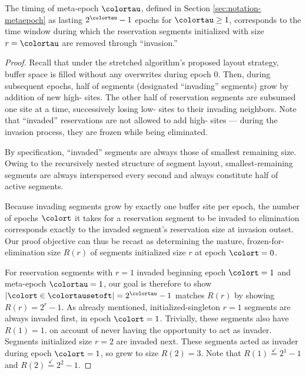\begin{lemma}
\label{thm:stretched-meta-epoch}

The timing of meta-epoch $\colortau$, defined in Section \ref{sec:notation-metaepoch} as lasting $2^{\colortau} - 1$ epochs for $\colortau\geq1$, corresponds to the time window during which the reservation segments initialized with size $r=\colortau$ are removed through ``invasion.''
\end{lemma}

\begin{proof}

Recall that under the stretched algorithm's proposed layout strategy, buffer space is filled without any overwrites during epoch 0.
Then, during subsequent epochs, half of segments (designated ``invading'' segments) grow by addition of new high-\hv{} sites.
The other half of reservation segments are subsumed one site at a time, successively losing low-\hv{} sites to their invading neighbors.
Note that ``invaded'' reservations are not allowed to add high-\hv{} sites --- during the invasion process, they are frozen while being eliminated.

By specification, ``invaded'' segments are always those of smallest remaining size.
Owing to the recursively nested structure of segment layout, smallest-remaining segments are always interspersed every second and always constitute half of active segments.

Because invading segments grow by exactly one buffer site per epoch, the number of epochs $\colort$ it takes for a reservation segment to be invaded to elimination corresponds exactly to the invaded segment's reservation size at invasion outset.
Our proof objective can thus be recast as determining the mature, frozen-for-elimination size $R(r)$ of segments initialized size $r$ at epoch $\colort=0$.

For reservation segments with $r=1$ invaded beginning epoch $\colort=1$ and meta-epoch $\colortau = 1$, our goal is therefore to show $|\colort \in \colortausetoft| = 2^{\colortau} - 1$ matches $R(r)$ by showing $R(r) = 2^{r} - 1$.
As already mentioned, initialized-singleton $r=1$ segments are always invaded first, in epoch $\colort=1$.
Trivially, these segments also have $R(1) = 1$. on account of never having the opportunity to act as invader.
Segments initialized size $r=2$ are invaded next.
These segments acted as invader during epoch $\colort=1$, so grew to size $R(2) = 3$.
Note that $R(1) \stackrel{\checkmark}{=} 2^1 - 1$ and $R(2) \stackrel{\checkmark}{=} 2^2 - 1$.


\end{proof}
